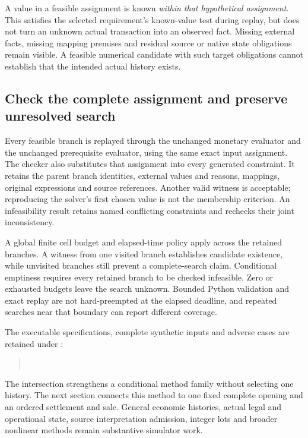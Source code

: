 A value in a feasible assignment is known \emph{within that hypothetical
assignment}. This satisfies the selected requirement's known-value test during
replay, but does not turn an unknown actual transaction into an observed fact.
Missing external facts, missing mapping premises and residual source or native
state obligations remain visible. A feasible numerical candidate with such
target obligations cannot establish that the intended actual history exists.

\subsection{Check the complete assignment and preserve unresolved search}

Every feasible branch is replayed through the unchanged monetary evaluator and
the unchanged prerequisite evaluator, using the same exact input assignment.
The checker also substitutes that assignment into every generated constraint.
It retains the parent branch identities, external values and reasons, mappings,
original expressions and source references. Another valid witness is acceptable;
reproducing the solver's first chosen value is not the membership criterion.
An infeasibility result retains named conflicting constraints and rechecks their
joint inconsistency.

A global finite cell budget and elapsed-time policy apply across the retained
branches. A witness from one visited branch establishes candidate existence,
while unvisited branches still prevent a complete-search claim. Conditional
emptiness requires every retained branch to be checked infeasible. Zero or
exhausted budgets leave the search unknown. Bounded Python validation and exact
replay are not hard-preempted at the elapsed deadline, and repeated searches near
that boundary can report different coverage.

The executable specifications, complete synthetic inputs and adverse cases are
retained under :
\begin{quote}\small
{}\\
\end{quote}
The intersection strengthens a
conditional method family without selecting one history. The next section
connects this method to one fixed complete opening and an ordered settlement
and sale. General economic histories, actual legal and operational state,
source interpretation admission, integer lots and broader nonlinear methods
remain substantive simulator work.


